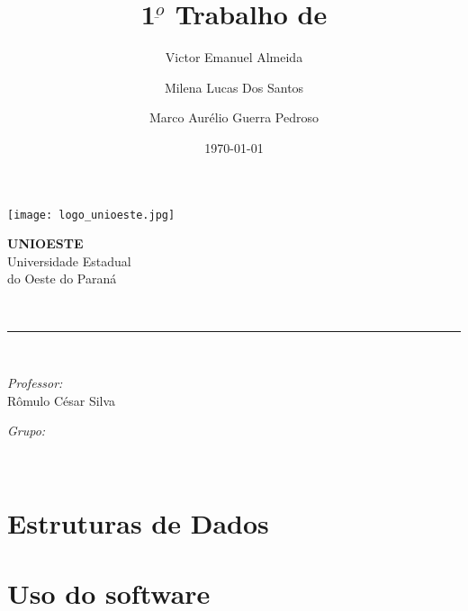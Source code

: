 \documentclass[12pt, a4paper]{article}
\author{Victor Emanuel Almeida\and Milena Lucas Dos Santos\and Marco Aurélio Guerra Pedroso}
\title{1$^{\underbar{o}}$ Trabalho de \materia}
\date{\today}
\newcommand{\prof}{Rômulo César Silva}
\begin{document}
\begin{titlepage}
	\centering
	\thispagestyle{fancy}

	\begin{minipage}{0.4\textwidth}
		\begin{flushleft}
			\texttt{[image: logo\_unioeste.jpg]}\\[1.0 cm]
		\end{flushleft}
	\end{minipage}
	\begin{minipage}{0.5\textwidth}
		\begin{flushright}\large
			\textsc{\LARGE\textbf{UNIOESTE}}\\
			\vspace{1cm}
			Universidade Estadual\\do Oeste do Paraná
		\end{flushright}
	\end{minipage}
	\vspace*{4.5 cm}

	{\huge\bfseries\thetitle}\\
	\rule{\linewidth}{0.2 mm}\\[1.5 cm]
	
	\vspace{2cm}
	\begin{minipage}[t]{0.4\textwidth}
		\begin{flushleft}\large
			\emph{Professor:}\\
			\prof\\
		\end{flushleft}
	\end{minipage}
	\begin{minipage}[t]{0.5\textwidth}

		\begin{flushright}\large
			\emph{Grupo:}\\
			\theauthor
		\end{flushright}

	\end{minipage}\\[2 cm]
	
	\vfill\thedate
	\end{titlepage}

	\pagestyle{fancy}
	\fancyfoot[L]{}
	\fancyhead[L]{}
	\fancyhead[R]{}

	\tableofcontents
	\newpage

	\section{Estruturas de Dados}\label{Estruturas de Dados}

	\section{Uso do software}\label{Uso do software}
\end{document}
